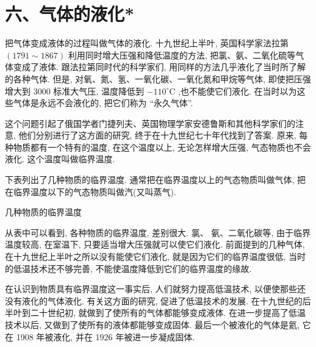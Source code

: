 \documentclass[10pt]{article}
\begin{document}
\section*{六、气体的液化*}

把气体变成液体的过程叫做气体的液化. 十九世纪上半叶, 英国科学家法拉第 \(\left( {{1791} \sim {1867}}\right)\) 利用同时增大压强和降低温度的方法, 把氯、氨、二氧化硫等气体变成了液体. 跟法拉第同时代的科学家们, 用同样的方法几乎液化了当时所了解的各种气体. 但是, 对氧、氮、氢、一氧化碳、一氧化氮和甲烷等气体, 即使把压强增大到 3000 标准大气压, 温度降低到 \(- {110}^{ \circ }\mathrm{C}\) ,也不能使它们液化. 在当时以为这些气体是永远不会液化的, 把它们称为 “永久气体”.

这个问题引起了俄国学者门捷列夫、英国物理学家安德鲁斯和其他科学家们的注意, 他们分别进行了这方面的研究, 终于在十九世纪七十年代找到了答案. 原来, 每种物质都有一个特有的温度, 在这个温度以上, 无论怎样增大压强, 气态物质也不会液化. 这个温度叫做临界温度.

下表列出了几种物质的临界温度. 通常把在临界温度以上的气态物质叫做气体, 把在临界温度以下的气态物质叫做汽(又叫蒸气).

几种物质的临界温度

\begin{center}
\end{center}

从表中可以看到, 各种物质的临界温度, 差别很大. 氯、 氨、二氧化碳等, 由于临界温度较高, 在室温下, 只要适当增大压强就可以使它们液化. 前面提到的几种气体, 在十九世纪上半叶之所以没有能使它们液化, 就是因为它们的临界温度很低, 当时的低温技术还不够完善, 不能使温度降低到它们的临界温度的缘故.

在认识到物质具有临界温度这一事实后, 人们就努力提高低温技术, 以便使那些还没有液化的气体液化. 有关这方面的研究, 促进了低温技术的发展. 在十九世纪的后半叶到二十世纪初, 就做到了使所有的气体都能够变成液体. 在进一步提高了低温技术以后, 又做到了使所有的液体都能够变成固体. 最后一个被液化的气体是氦, 它在 1908 年被液化, 并在 1926 年被进一步凝成固体.
\end{document}
